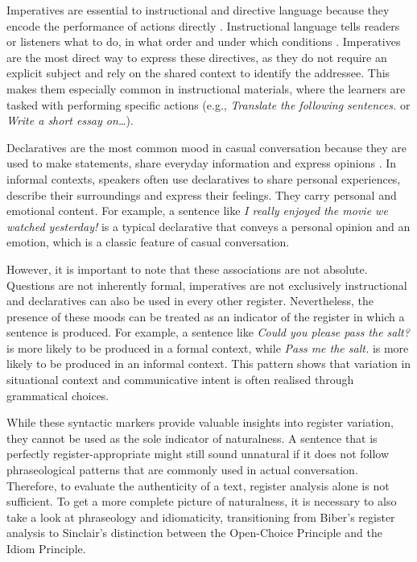 \documentclass[11pt,a4paper]{article}
\begin{document}
Imperatives are essential to instructional and directive language because they encode the performance of actions directly \parencite[54]{kia2018directive}. Instructional language tells readers or listeners what to do, in what order and under which conditions \parencite[930]{huddlestonPullumCambridge2002}. Imperatives are the most direct way to express these directives, as they do not require an explicit subject and rely on the shared context to identify the addressee. This makes them especially common in instructional materials, where the learners are tasked with performing specific actions (e.g., \textit{Translate the following sentences.} or \textit{Write a short essay on\ldots}). 

Declaratives are the most common mood in casual conversation because they are used to make statements, share everyday information and express opinions \parencite[97]{hallidayMatthiessenIntroductionFunctional2014}. In informal contexts, speakers often use declaratives to share personal experiences, describe their surroundings and express their feelings. They carry personal and emotional content. For example, a sentence like \textit{I really enjoyed the movie we watched yesterday!} is a typical declarative that conveys a personal opinion and an emotion, which is a classic feature of casual conversation.

However, it is important to note that these associations are not absolute. Questions are not inherently formal, imperatives are not exclusively instructional and declaratives can also be used in every other register. Nevertheless, the presence of these moods can be treated as an indicator of the register in which a sentence is produced. For example, a sentence like \textit{Could you please pass the salt?} is more likely to be produced in a formal context, while \textit{Pass me the salt.} is more likely to be produced in an informal context. This pattern shows that variation in situational context and communicative intent is often realised through grammatical choices.

While these syntactic markers provide valuable insights into register variation, they cannot be used as the sole indicator of naturalness. A sentence that is perfectly register-appropriate might still sound unnatural if it does not follow phraseological patterns that are commonly used in actual conversation. Therefore, to evaluate the authenticity of a text, register analysis alone is not sufficient. To get a more complete picture of naturalness, it is necessary to also take a look at phraseology and idiomaticity, transitioning from Biber's register analysis to Sinclair's \parencite*{sinclairCorpusConcordanceCollocation1991} distinction between the Open-Choice Principle and the Idiom Principle.
\end{document}
